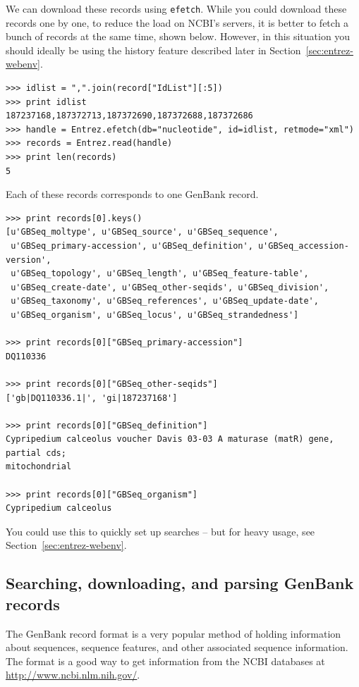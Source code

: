 \documentclass{report}
\begin{document}
\label{sec:entrez-batched-efetch}
We can download these records using \verb+efetch+.
While you could download these records one by one, to reduce the load on NCBI's servers, it is better to fetch a bunch of records at the same time, shown below.
However, in this situation you should ideally be using the history feature described later in Section~\ref{sec:entrez-webenv}.

\begin{verbatim}
>>> idlist = ",".join(record["IdList"][:5])
>>> print idlist
187237168,187372713,187372690,187372688,187372686
>>> handle = Entrez.efetch(db="nucleotide", id=idlist, retmode="xml")
>>> records = Entrez.read(handle)
>>> print len(records)
5
\end{verbatim}
Each of these records corresponds to one GenBank record.
\begin{verbatim}
>>> print records[0].keys()
[u'GBSeq_moltype', u'GBSeq_source', u'GBSeq_sequence',
 u'GBSeq_primary-accession', u'GBSeq_definition', u'GBSeq_accession-version',
 u'GBSeq_topology', u'GBSeq_length', u'GBSeq_feature-table',
 u'GBSeq_create-date', u'GBSeq_other-seqids', u'GBSeq_division',
 u'GBSeq_taxonomy', u'GBSeq_references', u'GBSeq_update-date',
 u'GBSeq_organism', u'GBSeq_locus', u'GBSeq_strandedness']

>>> print records[0]["GBSeq_primary-accession"]
DQ110336

>>> print records[0]["GBSeq_other-seqids"]
['gb|DQ110336.1|', 'gi|187237168']

>>> print records[0]["GBSeq_definition"]
Cypripedium calceolus voucher Davis 03-03 A maturase (matR) gene, partial cds;
mitochondrial

>>> print records[0]["GBSeq_organism"]
Cypripedium calceolus
\end{verbatim}

You could use this to quickly set up searches -- but for heavy usage, see Section~\ref{sec:entrez-webenv}.

\subsection{Searching, downloading, and parsing GenBank records}
\label{sec:entrez-search-fetch-genbank}

The GenBank record format is a very popular method of holding information about sequences, sequence features, and other associated sequence information. The format is a good way to get information from the NCBI databases at \url{http://www.ncbi.nlm.nih.gov/}.
\end{document}
